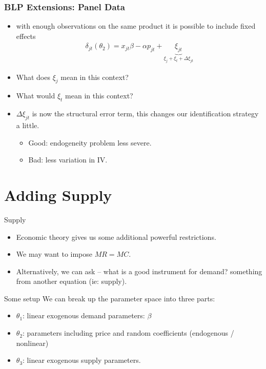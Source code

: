 \documentclass[aspectratio=169,10pt]{beamer}
\begin{document}
\begin{frame}
\frametitle{BLP Extensions: Panel Data}
\begin{itemize}
\item with enough observations on the same product it is possible to include fixed effects
\begin{eqnarray*}
\delta_{jt}(\theta_2) = x_{jt} \beta - \alpha p_{jt} + \underbrace{\xi_{jt}}_{\xi_{j} + \xi_t + \Delta \xi_{jt}}
\end{eqnarray*}
\item What does $\xi_{j}$ mean in this context?
\item What would $\xi_t$ mean in this context?
\item $\Delta \xi_{jt}$ is now the structural error term, this changes our identification strategy a little. 
\begin{itemize}
\item Good: endogeneity problem less severe.
\item Bad: less variation in IV.
\end{itemize}
\end{itemize}
\end{frame}


\section{Adding Supply}
\begin{frame}{Supply}
\begin{itemize}
\item Economic theory gives us some additional powerful restrictions.
\item We may want to impose $MR = MC$.
\item Alternatively, we can ask -- what is a good instrument for demand? \alert{something from another equation} (ie: supply).
\end{itemize}
\end{frame}

\begin{frame}{Some setup}
We can break up the parameter space into three parts:
\begin{itemize}
\item $\theta_1$: linear exogenous demand parameters: $\beta$ 
 \item $\theta_2$: parameters including price and random coefficients (endogenous / nonlinear)
 \item $\theta_3$: linear exogenous supply parameters.
\end{itemize}
\end{frame}
\end{document}
